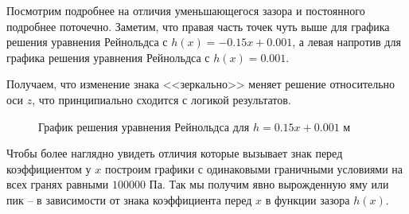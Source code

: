 \documentclass[a4paper,14pt]{extarticle}
\begin{document}
Посмотрим подробнее на отличия уменьшающегося зазора и постоянного подробнее поточечно. Заметим, что правая часть точек чуть выше для графика решения уравнения Рейнольдса с  $h(x) = -0.15x + 0.001$, а левая напротив для графика решения уравнения Рейнольдса с $h(x) = 0.001$.

Получаем, что изменение знака <<зеркально>> меняет решение относительно оси $z$, что принципиально сходится с логикой результатов.

\begin{figure}[!htbp]
	\caption{График решения уравнения Рейнольдса для $h = 0.15 x + 0.001$ м}
	\label{neg_res_diff}
\end{figure}

Чтобы более наглядно увидеть отличия которые вызывает знак перед коэффициентом у $x$ построим графики с одинаковыми граничными условиями на всех гранях равными $100000$ Па. Так мы получим явно вырожденную яму или пик -- в зависимости от знака коэффициента перед $x$ в функции зазора $h(x)$.

\newpage
\end{document}

